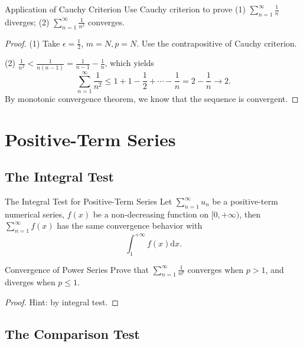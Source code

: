 \begin{example}{Application of Cauchy Criterion}{}
  Use Cauchy criterion to prove
  (1) $\sum\limits_{n = 1}^{\infty}\frac{1}{n}$ diverges;
  (2) $\sum\limits_{n = 1}^{\infty} \frac{1}{n^2}$ converges.
\end{example}

\begin{proof}
  (1) Take $\epsilon = \frac{1}{2}$, $m = N, p = N$.
  Use the contrapositive of Cauchy criterion.

  (2) $\frac{1}{n^2} < \frac{1}{n(n-1)} = \frac{1}{n-1} - \frac{1}{n}$,
  which yields
  \begin{equation}
    \sum\limits_{n = 1}^{\infty} \frac{1}{n^2}
    \leq 1 + 1 - \frac{1}{2} + \cdots - \frac{1}{n} = 2 - \frac{1}{n} \rightarrow 2.
  \end{equation}
  By monotonic convergence theorem, we know that the sequence is convergent.
\end{proof}

\section{Positive-Term Series}

\subsection{The Integral Test}

\begin{theorem}{The Integral Test for Positive-Term Series}{}
  Let $\sum\limits_{n = 1}^{\infty}u_n$ be a positive-term numerical series,
  $f(x)$ be a non-decreasing function on $[0, +\infty)$,
  then $\sum\limits_{n = 1}^{\infty} f(x)$ has the same convergence behavior with
  \begin{equation}
    \int_1^{+\infty} f(x) \mathrm{d} x.
  \end{equation}
\end{theorem}

\begin{example}{Convergence of Power Series}{}
  Prove that $\sum\limits_{n = 1}^{\infty} \frac{1}{n^p}$ converges when $p >
  1$,
  and diverges when $p \leq 1$.
\end{example}

\begin{proof}
  Hint: by integral test.
\end{proof}

\subsection{The Comparison Test}

